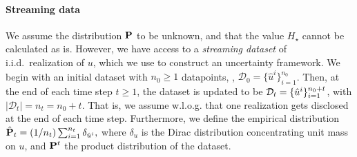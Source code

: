 


\paragraph{Streaming data}
We assume the distribution ${\mathbf P}$ to be unknown, and that the value $H_\star$ cannot be calculated as is. 
However, we have access to a {\it streaming dataset} of i.i.d.\ realization of $u$, which we use to construct an uncertainty framework. 
We begin with an initial dataset with $n_0 \geq 1$ datapoints, \ie, $\mathcal{D}_0 = \{\hat{u}^i\}_{i=1}^{n_0}$. Then, at the end of each time step $t \geq 1$, the dataset is updated to be $\mathcal{D}_t = \{\hat{u}^{i}\}_{i=1}^{n_0 + t}$, with $|\mathcal{D}_t| = n_t = n_0 + t$. That is, we assume w.l.o.g. that one realization gets disclosed at the end of each time step. Furthermore, we define the empirical distribution $\hat{{\mathbf P}}_t = (1/{n_t})\sum_{i=1}^{n_t} \delta_{\hat{u}^{i}},$
where $\delta_u$ is the Dirac distribution concentrating unit mass on $u$, and ${\mathbf P}^t$ the product distribution of the dataset. 




